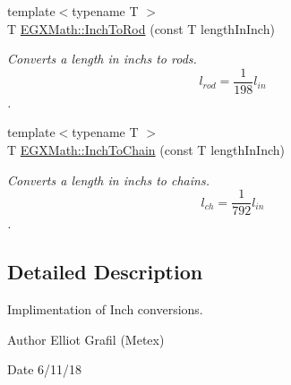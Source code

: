 \begin{DoxyCompactItemize}
{\footnotesize template$<$typename T $>$ }\\T \mbox{\hyperlink{group___e_g_x_math-_conversions-_length_conversions-_imperial-_inch-_surveyors_gaa045e03f8adf2c109c70a2446ac391ef}{E\+G\+X\+Math\+::\+Inch\+To\+Rod}} (const T length\+In\+Inch)
\begin{DoxyCompactList}\small\item\em Converts a length in inchs to rods. \[ l_{rod}= \frac{1}{198} l_{in} \]. \end{DoxyCompactList}\item 
{\footnotesize template$<$typename T $>$ }\\T \mbox{\hyperlink{group___e_g_x_math-_conversions-_length_conversions-_imperial-_inch-_surveyors_ga9345ec4d847b89c4e61531f8044d10d8}{E\+G\+X\+Math\+::\+Inch\+To\+Chain}} (const T length\+In\+Inch)
\begin{DoxyCompactList}\small\item\em Converts a length in inchs to chains. \[ l_{ch}= \frac{1}{792} l_{in} \]. \end{DoxyCompactList}\end{DoxyCompactItemize}


\subsection{Detailed Description}
Implimentation of Inch conversions. 

\begin{DoxyAuthor}{Author}
Elliot Grafil (Metex) 
\end{DoxyAuthor}
\begin{DoxyDate}{Date}
6/11/18 
\end{DoxyDate}

